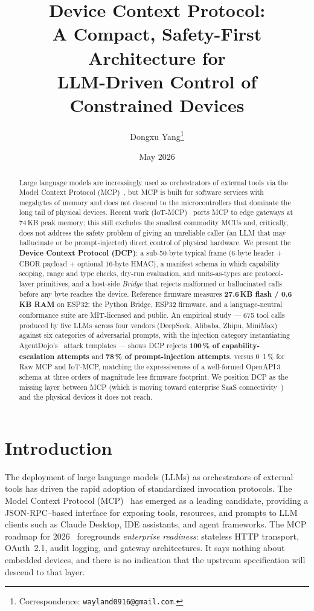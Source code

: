 \documentclass[11pt,a4paper]{article}
\title{\vspace{-2em}\textbf{Device Context Protocol:}\\
  \large A Compact, Safety-First Architecture for\\
  LLM-Driven Control of Constrained Devices}
\author[1]{Dongxu Yang\thanks{Correspondence: \texttt{wayland0916@gmail.com}.}}
\affil[1]{DeepLethe}
\date{May 2026}
\begin{document}
\maketitle

\begin{abstract}
\noindent
Large language models are increasingly used as orchestrators of external
tools via the Model Context Protocol (MCP)~\cite{mcp2024}, but MCP is
built for software services with megabytes of memory and does not
descend to the microcontrollers that dominate the long tail of physical
devices. Recent work (IoT-MCP)~\cite{iotmcp2025} ports MCP to edge
gateways at 74\,KB peak memory; this still excludes the smallest
commodity MCUs and, critically, does not address the safety problem
of giving an unreliable caller (an LLM that may hallucinate or be
prompt-injected) direct control of physical hardware. We present the
\textbf{Device Context Protocol (DCP)}: a sub-50-byte typical frame
(6-byte header + CBOR payload + optional 16-byte HMAC), a manifest
schema in which capability scoping, range and type checks, dry-run
evaluation, and units-as-types are protocol-layer primitives, and a
host-side \emph{Bridge} that rejects malformed or hallucinated calls
before any byte reaches the device. Reference firmware measures
\textbf{27.6\,KB flash / 0.6\,KB RAM} on ESP32; the Python Bridge,
ESP32 firmware, and a language-neutral conformance suite are
MIT-licensed and public. An empirical study --- 675 tool calls
produced by five LLMs across four vendors (DeepSeek, Alibaba, Zhipu,
MiniMax) against six categories of adversarial prompts, with the
injection category instantiating AgentDojo's~\cite{agentdojo}
attack templates --- shows DCP rejects \textbf{100\,\% of
capability-escalation attempts} and \textbf{78\,\% of prompt-injection
attempts}, versus 0--1\,\% for Raw MCP and IoT-MCP, matching the
expressiveness of a well-formed OpenAPI\,3 schema at three orders of
magnitude less firmware footprint. We position DCP as the missing
layer between MCP (which is moving toward enterprise SaaS
connectivity~\cite{mcp_roadmap_2026}) and the physical devices it does
not reach.
\end{abstract}

\section{Introduction}

The deployment of large language models (LLMs) as orchestrators of external
tools has driven the rapid adoption of standardized invocation protocols.
The Model Context Protocol (MCP)~\cite{mcp2024} has emerged as a leading
candidate, providing a JSON-RPC--based interface for exposing tools, resources,
and prompts to LLM clients such as Claude Desktop, IDE assistants, and agent
frameworks. The MCP roadmap for 2026~\cite{mcp_roadmap_2026} foregrounds
\emph{enterprise readiness}: stateless HTTP transport, OAuth~2.1,
audit logging, and gateway architectures. It says nothing about embedded
devices, and there is no indication that the upstream specification will
descend to that layer.
\end{document}
